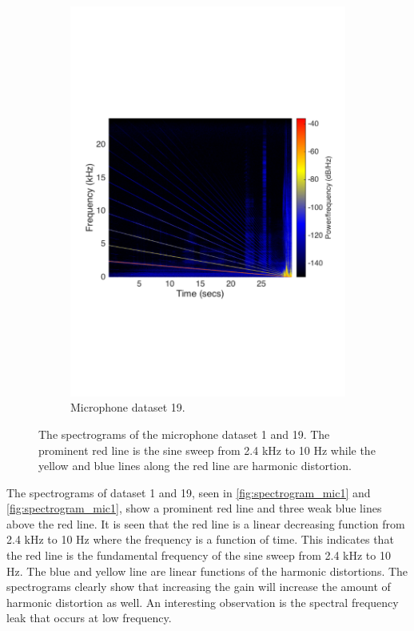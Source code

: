\begin{figure}[H]
\begin{subfigure}[t]{0.47\textwidth}
	\includegraphics[width=1\textwidth]{figures/spectrogram_mic19.pdf}
	\caption{Microphone dataset 19.}
	\label{fig:spectrogram_mic19}
\end{subfigure}
\caption{The spectrograms of the microphone dataset 1 and 19. The prominent red line is the sine sweep from 2.4 kHz to 10 Hz while the yellow and blue lines along the red line are harmonic distortion.}
\label{fig:spec_mic}
\end{figure} 

The spectrograms of dataset 1 and 19, seen in \autoref{fig:spectrogram_mic1} and \autoref{fig:spectrogram_mic1}, show a prominent red line and three weak blue lines above the red line. It is seen that the red line is a linear decreasing function from 2.4 kHz to 10 Hz where the frequency is a function of time. This indicates that the red line is the fundamental frequency of the sine sweep from 2.4 kHz to 10 Hz. The blue and yellow line are linear functions of the harmonic distortions. The spectrograms clearly show that increasing the gain will increase the amount of harmonic distortion as well. An interesting observation is the spectral frequency leak that occurs at low frequency. 



